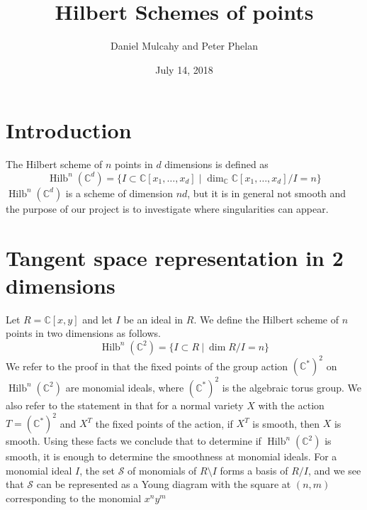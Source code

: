 \documentclass[a4page]{article}
\def\Hilb{\operatorname{Hilb}}
\theoremstyle{definition}
\def\S{\mathcal{S}}
\newcommand{\C}{\mathbb{C}}
\begin{document}
	
\title{\bf\Huge Hilbert Schemes of points}
\author{\Large Daniel Mulcahy and Peter Phelan}
\date{\vfill July 14, 2018}
	
\maketitle
\thispagestyle{empty}
\newpage
	
\tableofcontents
\thispagestyle{empty}
\newpage
\setcounter{page}{1}
	
\section{Introduction}
The Hilbert scheme of $n$ points in $d$ dimensions is defined as \[\Hilb^n(\C^d) = \{I \subset \C[x_1, \dots, x_d] \mid \dim_{\C} \C[x_1, \dots, x_d]/I = n\}\]
$\Hilb^n(\C^d)$ is a scheme of dimension $nd$, but it is in general not smooth and the purpose of our project is to investigate where singularities can appear.

\section{Tangent space representation in 2 dimensions}
Let $ R = \mathbb{C}[x,y] $ and let $I$ be an ideal in $R$.
We define the Hilbert scheme of $n$ points in two dimensions as follows.
$$ \Hilb^{n}(\mathbb{C}^{2}) = \{I \subset R \ | \ \dim{R/I} = n \} $$ We refer to the proof in \cite{nested_schemes} that the fixed points of the group action $ (\mathbb{C}^{*})^{2} $ on $ \Hilb^{n}(\mathbb{C}^{2})$ are monomial ideals, where $ (\mathbb{C}^{*})^{2} $ is the algebraic torus group.
We also refer to the statement in \cite{schemes} that for a normal variety $X$ with the action $ T = (\mathbb{C}^{*})^{2} $ and $ X^{T} $ the fixed points of the action, if $ X^{T} $ is smooth, then $ X $ is smooth.
Using these facts we conclude that to determine if $ \Hilb^{n}(\mathbb{C}^2)$ is smooth, it is enough to determine the smoothness at monomial ideals.
For a monomial ideal $I$, the set $\S$ of monomials of $R\setminus I$ forms a basis of $R/I$, and we see that $\S$ can be represented as a Young diagram with the square at $(n,m)$ corresponding to the monomial $x^ny^m$
\end{document}
